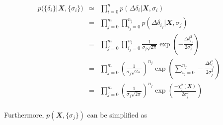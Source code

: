 \begin{eqnarray}
p\Big( \{\delta_i\} \Big| \mathbfit X, \{\sigma_i\}\Big) &\simeq& \prod_{i=0}^{n} p\left( \Delta\delta_i | \mathbfit X, \sigma_i \right)\\
& = & \prod_{j=0}^{m} \prod_{i_j=0}^{n_j} p\left( \Delta\delta_{i_j} | \mathbfit X, \sigma_j \right)\\
& = & \prod_{j=0}^{m} \prod_{i_j=0}^{n_j} \frac{1}{\sigma_j \sqrt{2\pi}} \exp{ \left( - \frac{\Delta\delta_{i_j}^2}{2\sigma_j^2} \right) }\\
& = & \prod_{j=0}^{m} \left( \frac{1}{\sigma_j \sqrt{2\pi}}\right)^{n_j} \exp{ \left( \sum_{i_j=0}^{n_j} - \frac{\Delta\delta_{i_j}^2}{2\sigma_j^2} \right) }\\
& = & \prod_{j=0}^{m} \left( \frac{1}{\sigma_j \sqrt{2\pi}}\right)^{n_j} \exp{ \left(  \frac{- \chi_j^2(\mathbfit X)}{2\sigma_j^2}\right) }
\end{eqnarray}\\
Furthermore, $p\left(\mathbfit X, \{\sigma_j\} \right)$ can be simplified as 

